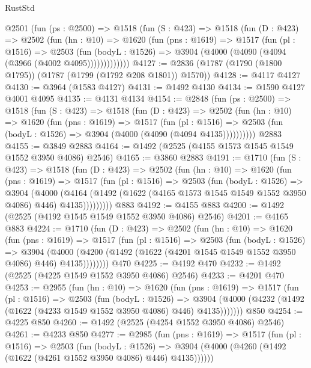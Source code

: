 \begin{lexlean}{RustStd}
\begin{coremodule}
{\begin{coremodule}
{{{{{{{{{{{{{    @2501
      (fun (ps : @2500) =>
      @1518
        (fun (S : @423) =>
        @1518
          (fun (D : @423) =>
          @2502
            (fun (hn : @10) =>
            @1620
              (fun (pns : @1619) =>
              @1517
                (fun (pl : @1516) =>
                @2503
                  (fun (bodyL : @1526) =>
                  @3904 (@4000 (@4090 (@4094 (@3966 (@4002 @4095)))))))))))))
@4127 := @2836 (@1787 (@1790 (@1800 @1795)) (@1787 (@1799 (@1792 @208 @1801)) @1570))
@4128 := @4117 @4127
@4130 := @3964 (@1583 @4127)
@4131 := @1492 @4130
@4134 := @1590 @4127 @4001 @4095
@4135 := @4131 @4134
@4154 := @2848
    (fun (ps : @2500) =>
    @1518
      (fun (S : @423) =>
      @1518
        (fun (D : @423) =>
        @2502
          (fun (hn : @10) =>
          @1620
            (fun (pns : @1619) =>
            @1517
              (fun (pl : @1516) =>
              @2503 (fun (bodyL : @1526) => @3904 (@4000 (@4090 (@4094 @4135))))))))))
    @2883
@4155 := @3849 @2883
@4164 := @1492 (@2525 (@4155 @1573 @1545 @1549 @1552 @3950 @4086) @2546)
@4165 := @3860 @2883
@4191 := @1710
    (fun (S : @423) =>
    @1518
      (fun (D : @423) =>
      @2502
        (fun (hn : @10) =>
        @1620
          (fun (pns : @1619) =>
          @1517
            (fun (pl : @1516) =>
            @2503
              (fun (bodyL : @1526) =>
              @3904
                (@4000
                  (@4164
                    (@1492 (@1622 (@4165 @1573 @1545 @1549 @1552 @3950 @4086) @446) @4135)))))))))
    @883
@4192 := @4155 @883
@4200 := @1492 (@2525 (@4192 @1545 @1549 @1552 @3950 @4086) @2546)
@4201 := @4165 @883
@4224 := @1710
    (fun (D : @423) =>
    @2502
      (fun (hn : @10) =>
      @1620
        (fun (pns : @1619) =>
        @1517
          (fun (pl : @1516) =>
          @2503
            (fun (bodyL : @1526) =>
            @3904
              (@4000 (@4200 (@1492 (@1622 (@4201 @1545 @1549 @1552 @3950 @4086) @446) @4135))))))))
    @470
@4225 := @4192 @470
@4232 := @1492 (@2525 (@4225 @1549 @1552 @3950 @4086) @2546)
@4233 := @4201 @470
@4253 := @2955
    (fun (hn : @10) =>
    @1620
      (fun (pns : @1619) =>
      @1517
        (fun (pl : @1516) =>
        @2503
          (fun (bodyL : @1526) =>
          @3904 (@4000 (@4232 (@1492 (@1622 (@4233 @1549 @1552 @3950 @4086) @446) @4135)))))))
    @850
@4254 := @4225 @850
@4260 := @1492 (@2525 (@4254 @1552 @3950 @4086) @2546)
@4261 := @4233 @850
@4277 := @2985
    (fun (pns : @1619) =>
    @1517
      (fun (pl : @1516) =>
      @2503
        (fun (bodyL : @1526) =>
        @3904 (@4000 (@4260 (@1492 (@1622 (@4261 @1552 @3950 @4086) @446) @4135))))))
}}}}}}}}}}}}}
\end{coremodule}}
\end{coremodule}
\end{lexlean}

